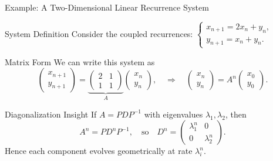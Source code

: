 \documentclass[aspectratio=169]{beamer}
\begin{document}
\begin{frame}{Example: A Two-Dimensional Linear Recurrence System}

\begin{block}{System Definition}
Consider the coupled recurrences:
$
\begin{cases}
x_{n+1} = 2x_n + y_n,\\
y_{n+1} = x_n + y_n.
\end{cases}
$
\end{block}
\vspace{-5mm}
\pause

\begin{block}{Matrix Form}
We can write this system as
\[
\begin{pmatrix}
x_{n+1}\\[3pt]
y_{n+1}
\end{pmatrix}
=
\underbrace{
\begin{pmatrix}
2 & 1\\
1 & 1
\end{pmatrix}}_{A}
\begin{pmatrix}
x_n\\[3pt]
y_n
\end{pmatrix},
\quad \Rightarrow \quad
\begin{pmatrix}
x_n\\
y_n
\end{pmatrix}
= A^n
\begin{pmatrix}
x_0\\
y_0
\end{pmatrix}.
\]
\end{block}

\pause
\vspace{-6mm}

\begin{exampleblock}{Diagonalization Insight}
If $A = P D P^{-1}$ with eigenvalues $\lambda_1, \lambda_2$, then
\[
A^n = P D^n P^{-1},
\quad \text{so} \quad
D^n =
\begin{pmatrix}
\lambda_1^n & 0\\
0 & \lambda_2^n
\end{pmatrix}.
\]
Hence each component evolves geometrically at rate $\lambda_i^n$.
\end{exampleblock}

\end{frame}
\end{document}
